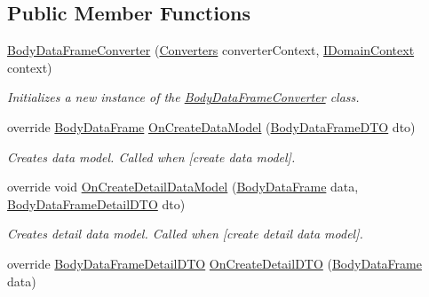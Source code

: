 \subsection*{Public Member Functions}
\begin{DoxyCompactItemize}
\item 
\mbox{\hyperlink{class_bar_none_1_1_shared_1_1_data_converters_1_1_body_data_frame_converter_a224a376c438bea5aeefa8a9925f54085}{Body\+Data\+Frame\+Converter}} (\mbox{\hyperlink{class_bar_none_1_1_shared_1_1_data_converters_1_1_converters}{Converters}} converter\+Context, \mbox{\hyperlink{interface_bar_none_1_1_shared_1_1_core_1_1_i_domain_context}{I\+Domain\+Context}} context)
\begin{DoxyCompactList}\small\item\em Initializes a new instance of the \mbox{\hyperlink{class_bar_none_1_1_shared_1_1_data_converters_1_1_body_data_frame_converter}{Body\+Data\+Frame\+Converter}} class. \end{DoxyCompactList}\item 
override \mbox{\hyperlink{class_bar_none_1_1_shared_1_1_domain_model_1_1_body_data_frame}{Body\+Data\+Frame}} \mbox{\hyperlink{class_bar_none_1_1_shared_1_1_data_converters_1_1_body_data_frame_converter_ab48f64b8447cfd1542d5fa57449cf3c5}{On\+Create\+Data\+Model}} (\mbox{\hyperlink{class_bar_none_1_1_shared_1_1_data_transfer_1_1_body_data_frame_d_t_o}{Body\+Data\+Frame\+D\+TO}} dto)
\begin{DoxyCompactList}\small\item\em Creates data model. Called when \mbox{[}create data model\mbox{]}. \end{DoxyCompactList}\item 
override void \mbox{\hyperlink{class_bar_none_1_1_shared_1_1_data_converters_1_1_body_data_frame_converter_a7523428785d51c60a974941a27f7fb48}{On\+Create\+Detail\+Data\+Model}} (\mbox{\hyperlink{class_bar_none_1_1_shared_1_1_domain_model_1_1_body_data_frame}{Body\+Data\+Frame}} data, \mbox{\hyperlink{class_bar_none_1_1_shared_1_1_data_transfer_1_1_body_data_frame_detail_d_t_o}{Body\+Data\+Frame\+Detail\+D\+TO}} dto)
\begin{DoxyCompactList}\small\item\em Creates detail data model. Called when \mbox{[}create detail data model\mbox{]}. \end{DoxyCompactList}\item 
override \mbox{\hyperlink{class_bar_none_1_1_shared_1_1_data_transfer_1_1_body_data_frame_detail_d_t_o}{Body\+Data\+Frame\+Detail\+D\+TO}} \mbox{\hyperlink{class_bar_none_1_1_shared_1_1_data_converters_1_1_body_data_frame_converter_a3b6065288efaf356c40163ec6c77a41a}{On\+Create\+Detail\+D\+TO}} (\mbox{\hyperlink{class_bar_none_1_1_shared_1_1_domain_model_1_1_body_data_frame}{Body\+Data\+Frame}} data)

\end{DoxyCompactItemize}
